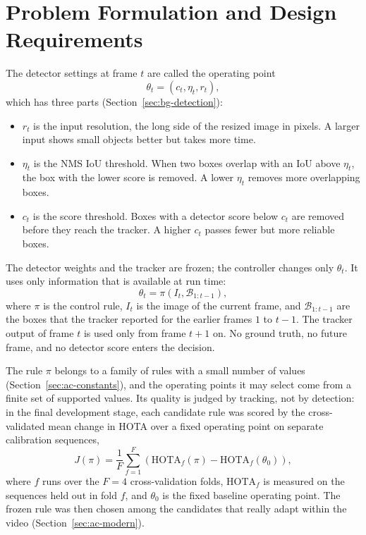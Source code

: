 \section{Problem Formulation and Design Requirements}\label{sec:ac-problem}
The detector settings at frame $t$ are called the operating point
\begin{equation}
\theta_t = (c_t, \eta_t, r_t),
\label{eq:ac-theta}
\end{equation}
which has three parts (Section~\ref{sec:bg-detection}):
\begin{itemize}
\item $r_t$ is the input resolution, the long side of the resized image in pixels. A larger input shows small objects better but takes more time.
\item $\eta_t$ is the NMS IoU threshold. When two boxes overlap with an IoU above $\eta_t$, the box with the lower score is removed. A lower $\eta_t$ removes more overlapping boxes.
\item $c_t$ is the score threshold. Boxes with a detector score below $c_t$ are removed before they reach the tracker. A higher $c_t$ passes fewer but more reliable boxes.
\end{itemize}
The detector weights and the tracker are frozen; the controller changes only $\theta_t$. It uses only information that is available at run time:
\begin{equation}
\theta_t = \pi\left(I_t, \mathcal{B}_{1:t-1}\right),
\label{eq:ac-policy}
\end{equation}
where $\pi$ is the control rule, $I_t$ is the image of the current frame, and $\mathcal{B}_{1:t-1}$ are the boxes that the tracker reported for the earlier frames $1$ to $t-1$. The tracker output of frame $t$ is used only from frame $t+1$ on. No ground truth, no future frame, and no detector score enters the decision.

The rule $\pi$ belongs to a family of rules with a small number of values (Section~\ref{sec:ac-constants}), and the operating points it may select come from a finite set of supported values. Its quality is judged by tracking, not by detection: in the final development stage, each candidate rule was scored by the cross-validated mean change in HOTA over a fixed operating point on separate calibration sequences,
\begin{equation}
J(\pi)=\frac{1}{F}\sum_{f=1}^{F}\left(\mathrm{HOTA}_f(\pi)-\mathrm{HOTA}_f(\theta_0)\right),
\label{eq:ac-objective}
\end{equation}
where $f$ runs over the $F=4$ cross-validation folds, $\mathrm{HOTA}_f$ is measured on the sequences held out in fold $f$, and $\theta_0$ is the fixed baseline operating point. The frozen rule was then chosen among the candidates that really adapt within the video (Section~\ref{sec:ac-modern}).

